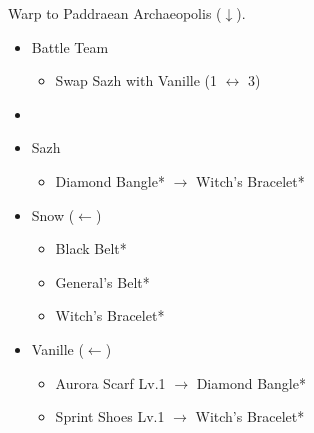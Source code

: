 Warp to Paddraean Archaeopolis ($\downarrow$).

\begin{menu}
	\begin{itemize}
	\paradigm
		\begin{itemize}
			\item Battle Team
				\begin{itemize}
					\item Swap Sazh with Vanille (1 $\leftrightarrow$ 3)
				\end{itemize}
			\item {}%
				{\paradigmline{\rav}{(\com)}{\rav}}%
				{\paradigmline{\com}{\com}{\com}}%
				{\paradigmline{(\sab)}{(\sen)}{\rav}}%
				{\paradigmline[4]{(\sab)}{\sen}{(\rav)}}%
				{\paradigmline{\med}{(\syn)}{\syn}}%
				{\paradigmline{(\sen)}{(\sen)}{(\sen)}}%
		\end{itemize}
	\equip
		\begin{itemize}
			\item Sazh
				\begin{itemize}
					\item Diamond Bangle* $\rightarrow$ Witch's Bracelet*
				\end{itemize}
			\item Snow ($\leftarrow$)
				\begin{itemize}
					\item Black Belt*
					\item General's Belt*
					\item Witch's Bracelet*
				\end{itemize}
			\item Vanille ($\leftarrow$)
				\begin{itemize}
					\item Aurora Scarf Lv.1 $\rightarrow$ Diamond Bangle*
					\item Sprint Shoes Lv.1 $\rightarrow$ Witch's Bracelet*
				\end{itemize}
		\end{itemize}
	\end{itemize}
\end{menu}

\renewcommand{\first}{[1] Relentless Assault (\rav/\com/\rav)}
\renewcommand{\second}{[2] Cerberus (\com/\com/\com)}
\renewcommand{\third}{[3] Matador (\sab/\sen/\rav)}
\renewcommand{\fourth}{[4] Matador (\sab/\sen/\rav)}
\renewcommand{\fifth}{[5] Recuperation (\med/\syn/\syn)}
\renewcommand{\sixth}{[6] Tortoise (\sen/\sen/\sen)}


